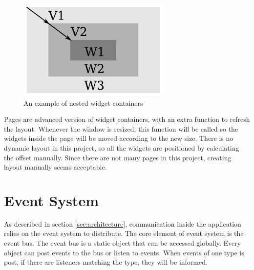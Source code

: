 \documentclass[msc,deptreport, cs]{infthesis}
\begin{document}
\begin{figure}[!htb]
  \centering
  \includegraphics[width=0.26\columnwidth]{container.pdf}
  \caption{An example of nested widget containers}
  \label{fig:container}
\end{figure}

Pages are advanced version of widget containers, with an extra function to refresh the layout. Whenever the window is resized, this function will be called so the widgets inside the page will be moved according to the new size. There is no dynamic layout in this project, so all the widgets are positioned by calculating the offset manually. Since there are not many pages in this project, creating layout manually seems acceptable. 

\section{Event System} \label{sec:event}

As described in section \ref{sec:architecture}, communication inside the application relies on the event system to distribute. The core element of event system is the event bus. The event bus is a static object that can be accessed globally. Every object can post events to the bus or listen to events. When events of one type is post, if there are listeners matching the type, they will be informed.
\end{document}

